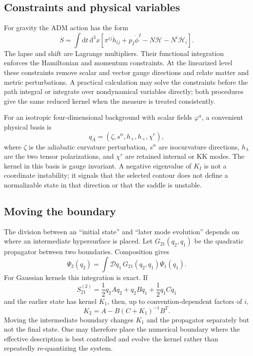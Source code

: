 \documentclass[aps,prd,twocolumn,superscriptaddress,nofootinbib,longbibliography]{revtex4-2}
\newcommand{\dd}{\mathrm d}
\begin{document}
\subsection{Constraints and physical variables}
For gravity the ADM action has the form
\begin{equation}
S=\int\dd t\,\dd^3x\left[\pi^{ij}\dot h_{ij}+p_I\dot\phi^I-N\mathcal H-N^i\mathcal H_i\right].
\end{equation}
The lapse and shift are Lagrange multipliers. Their functional integration enforces the Hamiltonian and momentum constraints. At the linearized level these constraints remove scalar and vector gauge directions and relate matter and metric perturbations. A practical calculation may solve the constraints before the path integral or integrate over nondynamical variables directly; both procedures give the same reduced kernel when the measure is treated consistently.

For an isotropic four-dimensional background with scalar fields $\varphi^a$, a convenient physical basis is
\begin{equation}
q_A=(\zeta,s^\alpha,h_+,h_\times,\chi^r),
\end{equation}
where $\zeta$ is the adiabatic curvature perturbation, $s^\alpha$ are isocurvature directions, $h_\lambda$ are the two tensor polarizations, and $\chi^r$ are retained internal or KK modes. The kernel in this basis is gauge invariant. A negative eigenvalue of $K_I$ is not a coordinate instability; it signals that the selected contour does not define a normalizable state in that direction or that the saddle is unstable.

\subsection{Moving the boundary}
The division between an ``initial state'' and ``later mode evolution'' depends on where an intermediate hypersurface is placed. Let $G_{21}(q_2,q_1)$ be the quadratic propagator between two boundaries. Composition gives
\begin{equation}
\Psi_2(q_2)=\int\mathcal Dq_1\,G_{21}(q_2,q_1)\Psi_1(q_1).
\end{equation}
For Gaussian kernels this integration is exact. If
\begin{equation}
S_{21}^{(2)}=\frac12q_2Aq_2+q_2Bq_1+\frac12q_1Cq_1
\end{equation}
and the earlier state has kernel $K_1$, then, up to convention-dependent factors of $i$,
\begin{equation}
K_2=A-B(C+K_1)^{-1}B^T.
\label{eq:compose}
\end{equation}
Moving the intermediate boundary changes $K_1$ and the propagator separately but not the final state. One may therefore place the numerical boundary where the effective description is best controlled and evolve the kernel rather than repeatedly re-quantizing the system.
\end{document}
